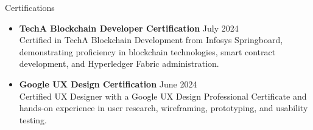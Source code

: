 \documentclass{resume} %
\begin{document}
\begin{rSection}{Certifications} 
        \begin{itemize}


            \item \textbf{TechA Blockchain Developer Certification} \hfill July 2024\\
            Certified in TechA Blockchain Development from Infosys Springboard, demonstrating proficiency in blockchain technologies, smart contract development, and Hyperledger Fabric administration.    
           
            \item \textbf{Google UX Design Certification} \hfill June 2024\\
            Certified UX Designer with a Google UX Design Professional Certificate and hands-on experience in user research, wireframing, prototyping, and usability testing. 


   

        \end{itemize}
        
        
        \end{rSection}
         
\end{document}

